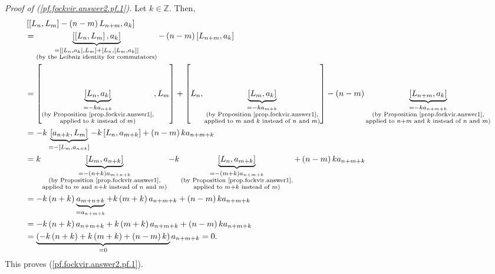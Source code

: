 \documentclass
[numbers=enddot,12pt,final,onecolumn,german,notitlepage]{scrartcl}%
\theoremstyle{definition}
\begin{document}
\textit{Proof of (\ref{pf.fockvir.answer2.pf.1}).} Let $k\in\mathbb{Z}$. Then,%
\begin{align*}
&  \left[  \left[  L_{n},L_{m}\right]  -\left(  n-m\right)  L_{n+m}%
,a_{k}\right] \\
&  =\underbrace{\left[  \left[  L_{n},L_{m}\right]  ,a_{k}\right]
}_{\substack{=\left[  \left[  L_{n},a_{k}\right]  ,L_{m}\right]  +\left[
L_{n},\left[  L_{m},a_{k}\right]  \right]  \\\text{(by the Leibniz identity
for commutators)}}}-\left(  n-m\right)  \left[  L_{n+m},a_{k}\right] \\
&  =\left[  \underbrace{\left[  L_{n},a_{k}\right]  }_{\substack{=-ka_{n+k}%
\\\text{(by Proposition \ref{prop.fockvir.answer1},}\\\text{applied to
}k\text{ instead of }m\text{)}}},L_{m}\right]  +\left[  L_{n}%
,\underbrace{\left[  L_{m},a_{k}\right]  }_{\substack{=-ka_{m+k}\\\text{(by
Proposition \ref{prop.fockvir.answer1},}\\\text{applied to }m\text{ and
}k\text{ instead of }n\text{ and }m\text{)}}}\right]  -\left(  n-m\right)
\underbrace{\left[  L_{n+m},a_{k}\right]  }_{\substack{=-ka_{n+m+k}\\\text{(by
Proposition \ref{prop.fockvir.answer1},}\\\text{applied to }n+m\text{ and
}k\text{ instead of }n\text{ and }m\text{)}}}\\
&  =-k\underbrace{\left[  a_{n+k},L_{m}\right]  }_{=-\left[  L_{m}%
,a_{n+k}\right]  }-k\left[  L_{n},a_{m+k}\right]  +\left(  n-m\right)
ka_{n+m+k}\\
&  =k\underbrace{\left[  L_{m},a_{n+k}\right]  }_{\substack{=-\left(
n+k\right)  a_{m+n+k}\\\text{(by Proposition \ref{prop.fockvir.answer1}%
,}\\\text{applied to }m\text{ and }n+k\text{ instead of }n\text{ and
}m\text{)}}}-k\underbrace{\left[  L_{n},a_{m+k}\right]  }_{\substack{=-\left(
m+k\right)  a_{n+m+k}\\\text{(by Proposition \ref{prop.fockvir.answer1}%
,}\\\text{applied to }m+k\text{ instead of }m\text{)}}}+\left(  n-m\right)
ka_{n+m+k}\\
&  =-k\left(  n+k\right)  \underbrace{a_{m+n+k}}_{=a_{n+m+k}}+k\left(
m+k\right)  a_{n+m+k}+\left(  n-m\right)  ka_{n+m+k}\\
&  =-k\left(  n+k\right)  a_{n+m+k}+k\left(  m+k\right)  a_{n+m+k}+\left(
n-m\right)  ka_{n+m+k}\\
&  =\underbrace{\left(  -k\left(  n+k\right)  +k\left(  m+k\right)  +\left(
n-m\right)  k\right)  }_{=0}a_{n+m+k}=0.
\end{align*}
This proves (\ref{pf.fockvir.answer2.pf.1}).
\end{document}
